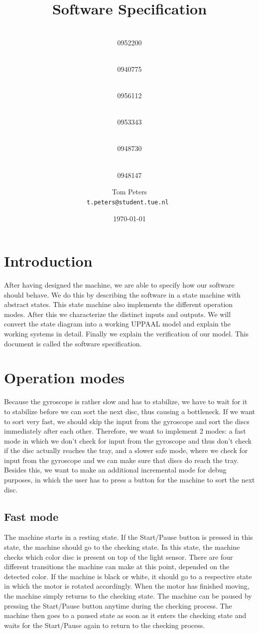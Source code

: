 \documentclass[a4paper,oneside,11pt]{article}
\title{\vspace{-\baselineskip}\sffamily\bfseries Software Specification}
\author{
	\makebox[.25\linewidth]{Sergio van Amerongen}\\0952200 \and
	\makebox[.25\linewidth]{Stefan Cloudt}\\0940775 \and
	\makebox[.25\linewidth]{Daan de Graaf}\\0956112 \and
	\makebox[.25\linewidth]{Robert van Lente}\\0953343 \and
	\makebox[.25\linewidth]{Tom Peters}\\0948730 \and
	\makebox[.25\linewidth]{Berrie Trippe}\\0948147 
	\and \makebox[.75\linewidth]{\textbf{Responsible:}} \and
	Tom Peters\\ \tt{t.peters@student.tue.nl}
}
\date{\today}
\begin{document}
\maketitle

\section{Introduction}
After having designed the machine, we are able to specify how our software should behave. We do this by describing the software in a state machine with abstract states. This state machine also implements the different operation modes. After this we characterize the distinct inputs and outputs. We will convert the state diagram into a working UPPAAL model and explain the working systems in detail. Finally we explain the verification of our model. This document is called the software specification.

\section{Operation modes}
Because the gyroscope is rather slow and has to stabilize, we have to wait for it to stabilize before we can sort the next disc, thus causing a bottleneck. If we want to sort very fast, we should skip the input from the gyroscope and sort the discs immediately after each other. Therefore, we want to implement 2 modes: a fast mode in which we don’t check for input from the gyroscope and thus don’t check if the disc actually reaches the tray, and a slower safe mode, where we check for input from the gyroscope and we can make sure that discs do reach the tray. Besides this, we want to make an additional incremental mode for debug purposes, in which the user has to press a button for the machine to sort the next disc.

\subsection{Fast mode}
The machine starts in a resting state. If the Start/Pause button is pressed in this state, the machine should go to the checking state. In this state, the machine checks which color disc is present on top of the light sensor. There are four different transitions the machine can make at this point, depended on the detected color. If the machine is black or white, it should go to a respective state in which the motor is rotated accordingly. When the motor has finished moving, the machine simply returns to the checking state. The machine can be paused by pressing the Start/Pause button anytime during the checking process. The machine then goes to a paused state as soon as it enters the checking state and waits for the Start/Pause again to return to the checking process.
\end{document}
